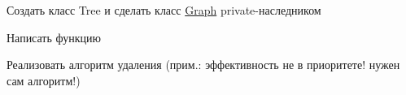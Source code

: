 
\begin{DoxyRefList}
\item[\label{todo__todo000004}%
\hypertarget{todo__todo000004}{}%
Класс \hyperlink{class_graph}{Graph} ]Создать класс Tree и сделать класс \hyperlink{class_graph}{Graph} private-\/наследником  
\item[\label{todo__todo000003}%
\hypertarget{todo__todo000003}{}%
Член \hyperlink{class_graph_a675ba6677488ad224ff32d0fde0644c5}{Graph\+:\+:build\+Bdd} (int values, int variables)]Написать функцию  
\item[\label{todo__todo000002}%
\hypertarget{todo__todo000002}{}%
Член \hyperlink{class_graph_a902c5b3eacb66d60752525ab23297a95}{Graph\+:\+:$\sim$\+Graph} ()]Реализовать алгоритм удаления (прим.\+: эффективность не в приоритете! нужен сам алгоритм!) 
\end{DoxyRefList}